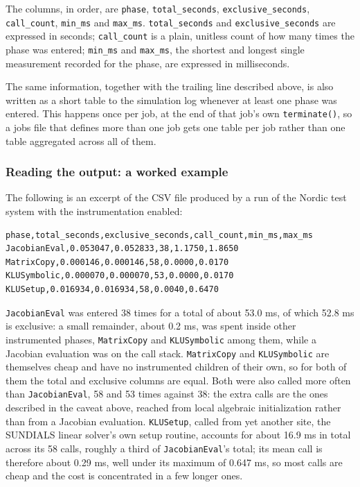 \documentclass[a4paper, 12pt]{report}
\begin{document}
The columns, in order, are \texttt{phase}, \texttt{total\_seconds}, \texttt{exclusive\_seconds}, \texttt{call\_count}, \texttt{min\_ms} and \texttt{max\_ms}. \texttt{total\_seconds} and \texttt{exclusive\_seconds} are expressed in seconds; \texttt{call\_count} is a plain, unitless count of how many times the phase was entered; \texttt{min\_ms} and \texttt{max\_ms}, the shortest and longest single measurement recorded for the phase, are expressed in milliseconds.

The same information, together with the trailing line described above, is also written as a short table to the simulation log whenever at least one phase was entered. This happens once per job, at the end of that job's own \texttt{terminate()}, so a jobs file that defines more than one job gets one table per job rather than one table aggregated across all of them.

\subsubsection{Reading the output: a worked example}

The following is an excerpt of the CSV file produced by a run of the Nordic test system with the instrumentation enabled:

\begin{lstlisting}[language=bash,numbers=none]
phase,total_seconds,exclusive_seconds,call_count,min_ms,max_ms
JacobianEval,0.053047,0.052833,38,1.1750,1.8650
MatrixCopy,0.000146,0.000146,58,0.0000,0.0170
KLUSymbolic,0.000070,0.000070,53,0.0000,0.0170
KLUSetup,0.016934,0.016934,58,0.0040,0.6470
\end{lstlisting}

\texttt{JacobianEval} was entered 38 times for a total of about 53.0 ms, of which 52.8 ms is exclusive: a small remainder, about 0.2 ms, was spent inside other instrumented phases, \texttt{MatrixCopy} and \texttt{KLUSymbolic} among them, while a Jacobian evaluation was on the call stack. \texttt{MatrixCopy} and \texttt{KLUSymbolic} are themselves cheap and have no instrumented children of their own, so for both of them the total and exclusive columns are equal. Both were also called more often than \texttt{JacobianEval}, 58 and 53 times against 38: the extra calls are the ones described in the caveat above, reached from local algebraic initialization rather than from a Jacobian evaluation. \texttt{KLUSetup}, called from yet another site, the SUNDIALS linear solver's own setup routine, accounts for about 16.9 ms in total across its 58 calls, roughly a third of \texttt{JacobianEval}'s total; its mean call is therefore about 0.29 ms, well under its maximum of 0.647 ms, so most calls are cheap and the cost is concentrated in a few longer ones.
\end{document}
